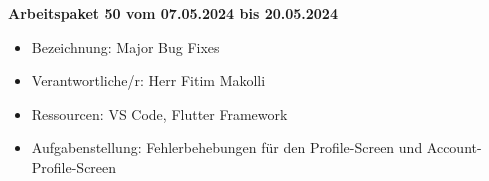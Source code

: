 \textbf{Arbeitspaket 50 vom 07.05.2024 bis 20.05.2024}
\begin{itemize}[itemsep=0pt]
    \item{Bezeichnung: Major Bug Fixes} 
	\item{Verantwortliche/r: Herr Fitim Makolli} 
	\item{Ressourcen: VS Code, Flutter Framework} 
    \item{Aufgabenstellung: Fehlerbehebungen für den Profile-Screen und Account-Profile-Screen}
\end{itemize} 
